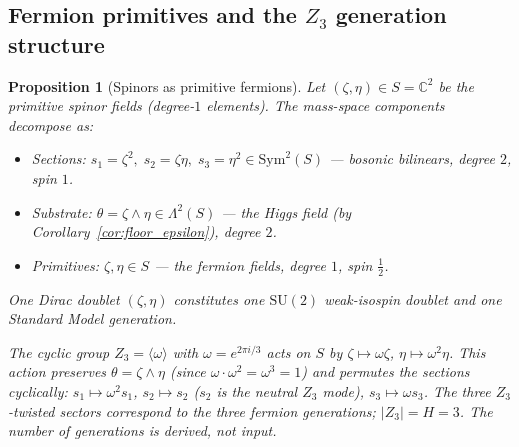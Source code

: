 \documentclass[11pt,a4paper]{article}
\newtheorem{proposition}[theorem]{Proposition}
\theoremstyle{definition}
\theoremstyle{remark}
\newcommand{\C}{\mathbb{C}}
\begin{document}
\subsection{Fermion primitives and the $Z_3$ generation structure}\label{sec:z3_fermions}

\begin{proposition}[Spinors as primitive fermions]\label{prop:z3_fermions}
Let $(\zeta,\eta)\in S=\C^2$ be the primitive spinor fields (degree-$1$ elements). The mass-space components decompose as:
\begin{itemize}[nosep]
\item Sections: $s_1=\zeta^2,\;s_2=\zeta\eta,\;s_3=\eta^2\in\mathrm{Sym}^2(S)$ --- bosonic bilinears, degree $2$, spin $1$.
\item Substrate: $\theta=\zeta\wedge\eta\in\Lambda^2(S)$ --- the Higgs field (by Corollary~\ref{cor:floor_epsilon}), degree $2$.
\item Primitives: $\zeta,\eta\in S$ --- the fermion fields, degree $1$, spin $\tfrac{1}{2}$.
\end{itemize}
One Dirac doublet $(\zeta,\eta)$ constitutes one $\mathrm{SU}(2)$ weak-isospin doublet and one Standard Model generation.

The cyclic group $Z_3=\langle\omega\rangle$ with $\omega=e^{2\pi i/3}$ acts on $S$ by $\zeta\mapsto\omega\zeta$, $\eta\mapsto\omega^2\eta$. This action preserves $\theta=\zeta\wedge\eta$ (since $\omega\cdot\omega^2=\omega^3=1$) and permutes the sections cyclically: $s_1\mapsto\omega^2 s_1$, $s_2\mapsto s_2$ ($s_2$ is the neutral $Z_3$ mode), $s_3\mapsto\omega s_3$. The three $Z_3$-twisted sectors correspond to the three fermion generations; $|Z_3|=H=3$. The number of generations is derived, not input.
\end{proposition}
\end{document}
